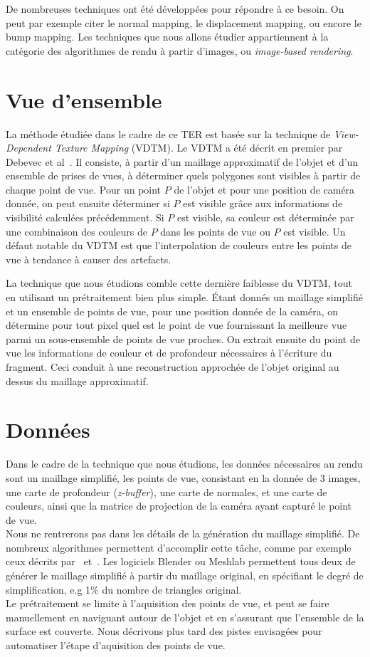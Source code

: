 De nombreuses techniques ont été développées pour répondre à ce besoin. On peut par exemple citer le normal mapping,
le displacement mapping, ou encore le bump mapping. Les techniques que nous allons étudier appartiennent à la catégorie des algorithmes de
rendu à partir d'images, ou \emph{image-based rendering}.\\

\section{Vue d'ensemble}
La méthode étudiée dans le cadre de ce TER est basée sur la technique de \emph{View-Dependent Texture Mapping} (VDTM).
Le VDTM a été décrit en premier par Debevec et al~\cite{Debevec96}. Il consiste, à partir d'un maillage
approximatif de l'objet et d'un ensemble de prises de vues, à déterminer quels polygones sont visibles à partir
de chaque point de vue. Pour un point $P$ de l'objet et pour une position de caméra donnée, on peut ensuite déterminer si $P$
est visible grâce aux informations de visibilité calculées précédemment. Si $P$ est visible, sa couleur est déterminée
par une combinaison des couleurs de $P$ dans les points de vue ou $P$ est visible. Un défaut notable du VDTM est
que l'interpolation de couleurs entre les points de vue à tendance à causer des artefacts.

La technique que nous étudions comble cette dernière faiblesse du VDTM, tout en utilisant un prétraitement bien plus simple.
\'Etant donnés un maillage simplifié et un ensemble de points de vue, pour une position donnée de la caméra, on détermine pour tout pixel
quel est le point de vue fournissant la meilleure vue parmi un sous-ensemble de points de vue proches. On extrait ensuite
du point de vue les informations de couleur et de profondeur nécessaires à l'écriture du fragment. Ceci conduit à une
reconstruction approchée de l'objet original au dessus du maillage approximatif.

\section{Données}
Dans le cadre de la technique que nous étudions, les données nécessaires au rendu sont un maillage simplifié, les points de vue,
consistant en la donnée de 3 images, une carte de profondeur (\emph{z-buffer}), une carte de normales, et une carte de couleurs, ainsi
que la matrice de projection de la caméra ayant capturé le point de vue.\\
Nous ne rentrerons pas dans les détails de la génération du maillage simplifié. De nombreux algorithmes permettent d'accomplir
cette tâche, comme par exemple ceux décrits par~\cite{Hoppe96} et~\cite{Garland97}. Les logiciels Blender ou Meshlab permettent
tous deux de générer le maillage simplifié à partir du maillage original, en spécifiant le degré de simplification, e.g 1\% du nombre
de triangles original.\\
Le prétraitement se limite à l'aquisition des points de vue, et peut se faire manuellement en naviguant autour de l'objet et en s'assurant
que l'ensemble de la surface est couverte. Nous décrivons plus tard des pistes envisagées pour automatiser l'étape d'aquisition des points de vue.

